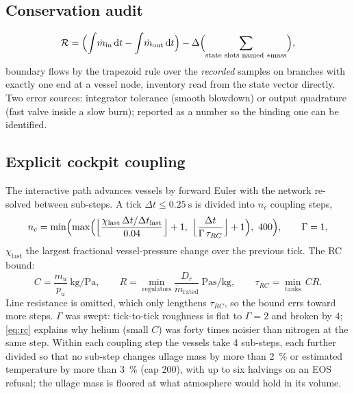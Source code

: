 \documentclass[11pt,a4paper]{article}
\newcommand{\mdot}{\dot{m}}
\begin{document}
\subsection{Conservation audit}
\begin{equation}
  \mathcal{R} = \Bigl(\int\!\mdot_{\mathrm{in}}\,\mathrm{d}t - \int\!\mdot_{\mathrm{out}}\,\mathrm{d}t\Bigr) - \Delta\Bigl(\sum_{\text{state slots named }\ast\text{mass}}\Bigr),
\end{equation}
boundary flows by the trapezoid rule over the \emph{recorded} samples on
branches with exactly one end at a vessel node, inventory read from the state
vector directly. Two error sources: integrator tolerance (smooth blowdown) or
output quadrature (fast valve inside a slow burn); reported as a number so the
binding one can be identified.

\subsection{Explicit cockpit coupling}\label{sec:rc}
The interactive path advances vessels by forward Euler with the network
re-solved between sub-steps. A tick $\Delta t\le\SI{0.25}{\second}$ is divided
into $n_c$ coupling steps,
\begin{equation}
  n_c = \min\Bigl(\max\Bigl(\Bigl\lfloor\frac{\chi_{\mathrm{last}}\,\Delta t/\Delta t_{\mathrm{last}}}{0.04}\Bigr\rfloor+1,\
    \Bigl\lfloor\frac{\Delta t}{\Gamma\,\tau_{RC}}\Bigr\rfloor+1\Bigr),\ 400\Bigr),
  \qquad \Gamma=1,
\end{equation}
$\chi_{\mathrm{last}}$ the largest fractional vessel-pressure change over the
previous tick. The RC bound:
\begin{equation}
  C=\frac{m_u}{p_u}\ \si{\kilogram\per\pascal},\qquad
  R=\min_{\text{regulators}}\frac{D_r}{\mdot_{\mathrm{rated}}}\ \si{\pascal\second\per\kilogram},\qquad
  \tau_{RC}=\min_{\text{tanks}}\,CR .
  \label{eq:rc}
\end{equation}
Line resistance is omitted, which only lengthens $\tau_{RC}$, so the bound errs
toward more steps. $\Gamma$ was swept: tick-to-tick roughness is flat to
$\Gamma=2$ and broken by $4$; \cref{eq:rc} explains why helium (small $C$) was
forty times noisier than nitrogen at the same step. Within each coupling step
the vessels take 4 sub-steps, each further divided so that no sub-step changes
ullage mass by more than \SI{2}{\percent} or estimated temperature by more than
\SI{3}{\percent} (cap 200), with up to six halvings on an EOS refusal; the
ullage mass is floored at what atmosphere would hold in its volume.
\end{document}
